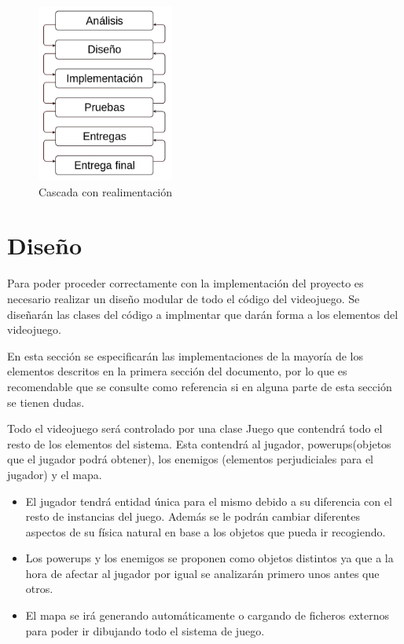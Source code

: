 \documentclass[palatino]{apuntes}
\begin{document}
\begin{figure}[hbtp]
    \centering
    \includegraphics[width=0.4\textwidth]{img/cascada.png}
    \caption{Cascada con realimentación}
    \label{fig:cascadarealimentacion}
\end{figure}





\section{Diseño}

Para poder proceder correctamente con la implementación del proyecto es necesario realizar un diseño modular de todo el código del videojuego. Se diseñarán las clases del código a implmentar que darán forma a los elementos del videojuego.

En esta sección se especificarán las implementaciones de la mayoría de los elementos descritos en la primera sección del documento, por lo que es recomendable que se consulte como referencia si en alguna parte de esta sección se tienen dudas.

Todo el videojuego será controlado por una clase Juego que contendrá todo el resto de los elementos del sistema. Esta contendrá al jugador, powerups(objetos que el jugador podrá obtener), los enemigos (elementos perjudiciales para el jugador) y el mapa.

\begin{itemize}
	\item El jugador tendrá entidad única para el mismo debido a su diferencia con el resto de instancias del juego. Además se le podrán cambiar diferentes aspectos de su física natural en base a los objetos que pueda ir recogiendo.
	\item Los powerups y los enemigos se proponen como objetos distintos ya que a la hora de afectar al jugador por igual se analizarán primero unos antes que otros.
	\item El mapa se irá generando automáticamente o cargando de ficheros externos para poder ir dibujando todo el sistema de juego.
\end{itemize}
\end{document}
